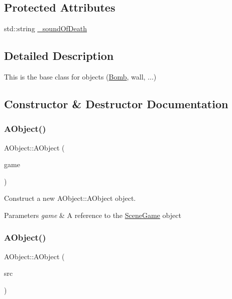 \subsection*{Protected Attributes}
\begin{DoxyCompactItemize}
\item 
std\+::string \hyperlink{class_a_object_abd487a37ad66b909b7d082c9655d43e0}{\+\_\+sound\+Of\+Death}
\end{DoxyCompactItemize}


\subsection{Detailed Description}
This is the base class for objects (\hyperlink{class_bomb}{Bomb}, wall, ...) 

\subsection{Constructor \& Destructor Documentation}
\mbox{\label{class_a_object_aac94ec1c7dd0ec00fda2a79f12195cf2}} 
\subsubsection{\texorpdfstring{A\+Object()}{AObject()}\hspace{0.1cm}{\footnotesize\ttfamily [1/2]}}
{\footnotesize\ttfamily A\+Object\+::\+A\+Object (\begin{DoxyParamCaption}\item[{\hyperlink{class_scene_game}{Scene\+Game} \&}]{game }\end{DoxyParamCaption})\hspace{0.3cm}{\ttfamily [explicit]}}



Construct a new A\+Object\+::\+A\+Object object. 


\begin{DoxyParams}{Parameters}
{\em game} & A reference to the \hyperlink{class_scene_game}{Scene\+Game} object \\
\hline
\end{DoxyParams}
\mbox{\label{class_a_object_a278727c68ad694b228c2f24e5e6d358a}} 
\subsubsection{\texorpdfstring{A\+Object()}{AObject()}\hspace{0.1cm}{\footnotesize\ttfamily [2/2]}}
{\footnotesize\ttfamily A\+Object\+::\+A\+Object (\begin{DoxyParamCaption}\item[{\hyperlink{class_a_object}{A\+Object} const \&}]{src }\end{DoxyParamCaption})}




